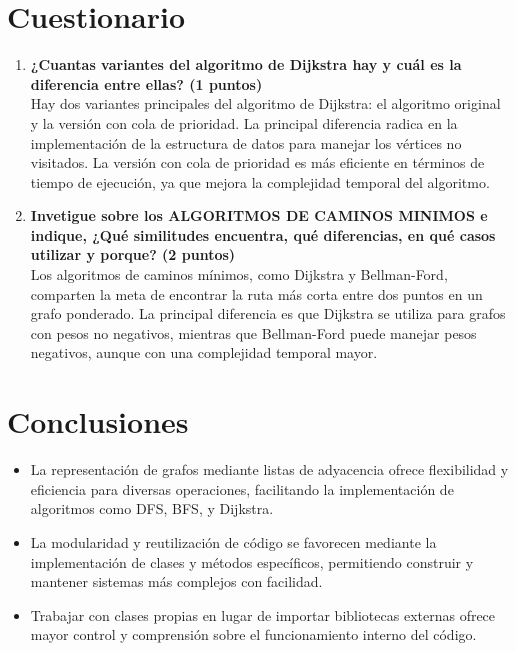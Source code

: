 \documentclass{article}
\begin{document}
            
    \section{Cuestionario}    

    \begin{enumerate}
        \item {\textbf{¿Cuantas variantes del algoritmo de Dijkstra hay y cuál es la diferencia entre ellas? (1 puntos)}} \\
        Hay dos variantes principales del algoritmo de Dijkstra: el algoritmo original y la versión con cola de prioridad. La principal diferencia radica en la implementación de la estructura de datos para manejar los vértices no visitados. La versión con cola de prioridad es más eficiente en términos de tiempo de ejecución, ya que mejora la complejidad temporal del algoritmo.

        \item {\textbf{Invetigue sobre los ALGORITMOS DE CAMINOS MINIMOS e indique, ¿Qué similitudes encuentra, qué diferencias, en qué casos utilizar y porque? (2 puntos)}}\\
        Los algoritmos de caminos mínimos, como Dijkstra y Bellman-Ford, comparten la meta de encontrar la ruta más corta entre dos puntos en un grafo ponderado. La principal diferencia es que Dijkstra se utiliza para grafos con pesos no negativos, mientras que Bellman-Ford puede manejar pesos negativos, aunque con una complejidad temporal mayor.
    \end{enumerate}


    \section{Conclusiones}
        \begin{itemize}
            \item La representación de grafos mediante listas de adyacencia ofrece flexibilidad y eficiencia para diversas operaciones, facilitando la implementación de algoritmos como DFS, BFS, y Dijkstra.
            \item La modularidad y reutilización de código se favorecen mediante la implementación de clases y métodos específicos, permitiendo construir y mantener sistemas más complejos con facilidad.
            \item Trabajar con clases propias en lugar de importar bibliotecas externas ofrece mayor control y comprensión sobre el funcionamiento interno del código. 
        \end{itemize}
        
\end{document}
